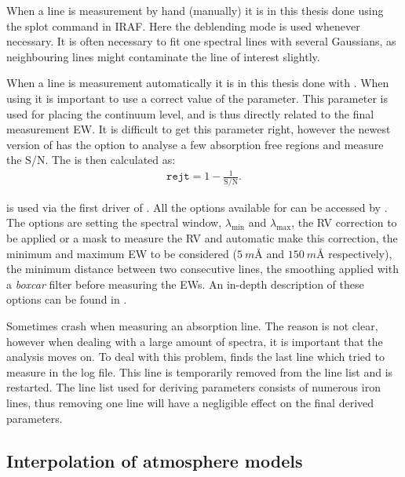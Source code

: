 When a line is measurement by hand (manually) it is in this thesis done using
the splot command in IRAF. Here the deblending mode is used whenever necessary.
It is often necessary to fit one spectral lines with several Gaussians, as
neighbouring lines might contaminate the line of interest slightly.

When a line is measurement automatically it is in this thesis done with \ARES
\citep{Sousa2007,Sousa2015a}. When using \ARES it is important to use a correct
value of the  parameter. This parameter is used for placing the
continuum level, and is thus directly related to the final measurement EW. It is
difficult to get this parameter right, however the newest version of \ARES has
the option to analyse a few absorption free regions and measure the S/N. The
 is then calculated as:
\begin{align*}
  \mathtt{rejt} = 1 - \frac{1}{\mathrm{S/N}}.
\end{align*}

\ARES is used via the first driver of \FASMA. All the options available for
\ARES can be accessed by \FASMA. The options are setting the spectral window,
$\lambda_\mathrm{min}$ and $\lambda_\mathrm{max}$, the RV correction to be
applied or a mask to measure the RV and automatic make this correction, the
minimum and maximum EW to be considered ($\SI{5}{m}$\AA{} and $\SI{150}{m}$\AA{}
respectively), the minimum distance between two consecutive lines, the smoothing
applied with a \emph{boxcar} filter before measuring the EWs. An in-depth
description of these options can be found in \citet{Sousa2007,Sousa2015a}.

Sometimes \ARES crash when measuring an absorption line. The reason is not
clear, however when dealing with a large amount of spectra, it is important that
the analysis moves on. To deal with this problem, \FASMA finds the last line
which \ARES tried to measure in the log file. This line is temporarily removed
from the line list and \ARES is restarted. The line list used for deriving
parameters consists of numerous iron lines, thus removing one line will have a
negligible effect on the final derived parameters.



\subsection{Interpolation of atmosphere models}
\label{sec:interpolation}

